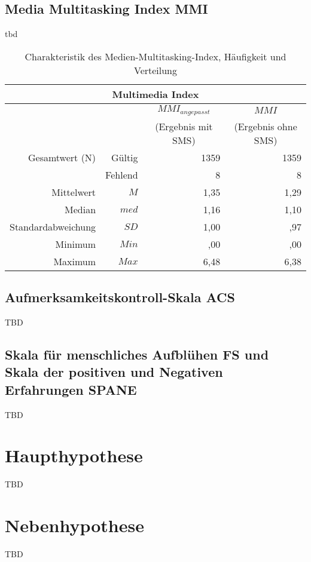 \subsection{Media Multitasking Index MMI}
tbd
\begin{table}[ht] 
    \centering
    \caption{Charakteristik des Medien-Multitasking-Index, Häufigkeit und Verteilung}
    \begin{tabular}[t]{|rr|r|r|} 
        \hline
        \multicolumn{4}{|c|}{\textbf{Multimedia Index}}\\ 
        \hline       
        \multicolumn{2}{|c}{} & \multicolumn{1}{c|}{$MMI_{angepasst}$} & \multicolumn{1}{|c|}{$MMI$}\\
        \multicolumn{2}{|c}{} & \multicolumn{1}{c|}{(Ergebnis mit SMS)} & \multicolumn{1}{|c|}{(Ergebnis ohne SMS)}\\
        \hline
        Gesamtwert (N) & Gültig & 1359 & 1359\\
        & Fehlend & 8 & 8\\
        Mittelwert & $M$ & 1,35 & 1,29\\
        Median & $med$ & 1,16 & 1,10\\
        Standardabweichung & $SD$ & 1,00 & ,97\\
        Minimum & $Min$ & ,00 & ,00\\
        Maximum & $Max$ & 6,48 & 6,38\\
        \hline
    \end{tabular}
    \label{table.sozidemoZivil}
\end{table}
\subsection{Aufmerksamkeitskontroll-Skala ACS}
TBD

\subsection{Skala für menschliches Aufblühen FS und Skala der positiven und Negativen Erfahrungen SPANE}
TBD
\section{Haupthypothese}\label{label.haupthypothese}
TBD
\section{Nebenhypothese}\label{label.nebenhypothese}
TBD

